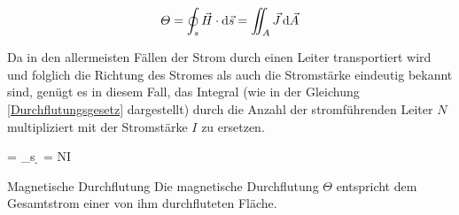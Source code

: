 \begin{frame}
{		\begin{equation}
			\varTheta = \oint_s \vec{H}\cdot \mathrm{d}\vec{s} = \iint_A \vec{J}\,\mathrm{d}\vec{A}\label{Durchflutung}
		\end{equation}

		Da in den allermeisten Fällen der Strom durch einen Leiter transportiert wird und folglich die Richtung des Stromes als auch die Stromstärke eindeutig bekannt sind, genügt es in diesem Fall, das Integral (wie in der Gleichung \ref{Durchflutungsgesetz} dargestellt) durch die Anzahl der stromführenden Leiter $N$ multipliziert mit der Stromstärke $I$ zu ersetzen.

		\begin{eq}
			\varTheta = \oint_s \cdot \d{} = N\cdot I\label{Durchflutungsgesetz} \qquad [\mathrm{A}]
		\end{eq}

		\begin{Merksatz}{Magnetische Durchflutung}
			Die magnetische Durchflutung $\varTheta$ entspricht dem Gesamtstrom einer von ihm durchfluteten Fläche.
		\end{Merksatz}

}
\end{frame}
